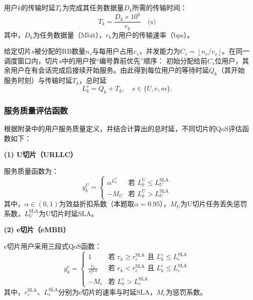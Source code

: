 用户$k$的传输时延$T_k$为完成其任务数据量$D_k$所需的传输时间：
\begin{equation}
T_k = \frac{D_k \times 10^6}{r_k} \quad \text{(s)}
\end{equation}
其中，$D_k$为任务数据量（Mbit），$r_k$为用户的传输速率（bps）。

给定切片$s$被分配的RB数量$n_s$与每用户占用$v_s$，并发能力为$C_s=\left\lfloor n_s / v_s \right\rfloor$。在同一调度窗口内，切片$s$中的用户按“编号靠前优先”顺序：
初始分配给前$C_s$位用户，其余用户在有会话完成后接续开始服务。由此得到每位用户的等待时延$Q_k$（其开始服务时刻）与传输时延$T_k$，总时延
\begin{equation}
L_k^{s} = Q_k + T_k, \quad s \in \{U, e, m\}.
\end{equation}

\subsubsection{服务质量评估函数}

根据附录中的用户服务质量定义，并结合计算出的总时延，不同切片的QoS评估函数如下：

\textbf{(1) U切片（URLLC）}

服务质量函数为：
\begin{equation}
y_k^{U} = \begin{cases}
\alpha^{L_k^{U}} & \text{若 } L_k^{U} \leq L_{U}^{\text{SLA}} \\
-M_{U} & \text{若 } L_k^{U} > L_{U}^{\text{SLA}}
\end{cases}
\end{equation}
其中，$\alpha\in(0,1)$为效益折扣系数（本题取$\alpha=0.95$），$M_U$为U切片任务丢失惩罚系数，$L_U^{\text{SLA}}$为U切片时延SLA。

\textbf{(2) e切片（eMBB）}

e切片用户采用三段式QoS函数：
\begin{equation}
y_k^{e} = \begin{cases}
1 & \text{若 } r_k \geq r_{e}^{\text{SLA}} \text{ 且 } L_k^{e} \leq L_{e}^{\text{SLA}} \\
\frac{r_k}{r_{e}^{\text{SLA}}} & \text{若 } r_k < r_{e}^{\text{SLA}} \text{ 且 } L_k^{e} \leq L_{e}^{\text{SLA}} \\
-M_{e} & \text{若 } L_k^{e} > L_{e}^{\text{SLA}}
\end{cases}
\end{equation}
其中，$r_e^{\text{SLA}}$、$L_e^{\text{SLA}}$分别为e切片的速率与时延SLA，$M_e$为惩罚系数。

